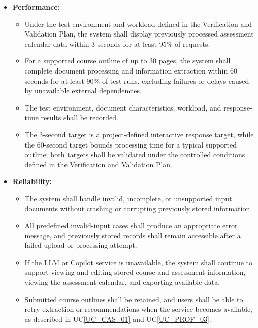 \documentclass[12pt]{article}
\newcommand{\ucref}[1]{UC\ref{#1}}
\newcounter{nfrnum} %
\begin{document}
\begin{itemize}
\item[NFR\refstepcounter{nfrnum}\thenfrnum \label{NFR_Performance}:]
\textbf{Performance:}
\begin{itemize}
    \item Under the test environment and workload defined in the Verification and Validation
    Plan, the system shall display previously processed assessment calendar data within 3
    seconds for at least 95\% of requests.
    \item For a supported course outline of up to 30 pages, the system shall complete document
    processing and information extraction within 60 seconds for at least 90\% of test runs,
    excluding failures or delays caused by unavailable external dependencies.
    \item The test environment, document characteristics, workload, and response-time results
    shall be recorded.
    \item The 3-second target is a project-defined interactive response target, while the
    60-second target bounds processing time for a typical supported outline; both targets
    shall be validated under the controlled conditions defined in the Verification and
    Validation Plan.
\end{itemize}

\item[NFR\refstepcounter{nfrnum}\thenfrnum \label{NFR_Reliability}:]
\textbf{Reliability:}
\begin{itemize}
    \item The system shall handle invalid, incomplete, or unsupported input documents without
    crashing or corrupting previously stored information.
    \item All predefined invalid-input cases shall produce an appropriate error message, and
    previously stored records shall remain accessible after a failed upload or processing
    attempt.
    \item If the LLM or Copilot service is unavailable, the system shall continue to support
    viewing and editing stored course and assessment information, viewing the assessment
    calendar, and exporting available data.
    \item Submitted course outlines shall be retained, and users shall be able to retry
    extraction or recommendations when the service becomes available, as described in
    \ucref{UC_CAS_01} and \ucref{UC_PROF_03}.
\end{itemize}


\end{itemize}
\end{document}
